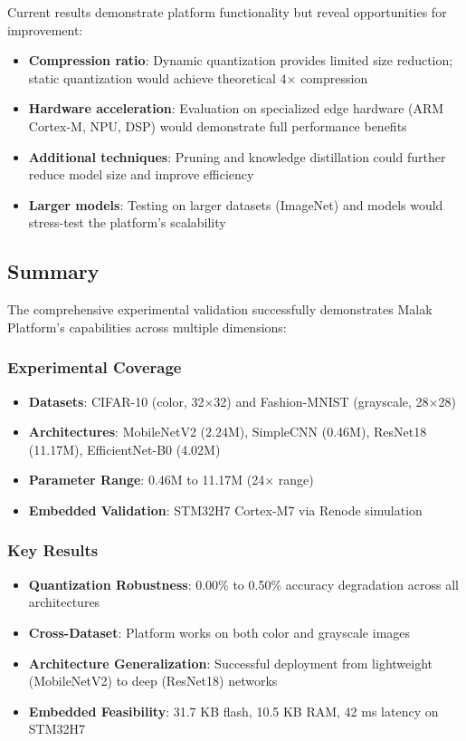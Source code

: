 Current results demonstrate platform functionality but reveal opportunities for improvement:

\begin{itemize}
\item \textbf{Compression ratio}: Dynamic quantization provides limited size reduction; static quantization would achieve theoretical 4$\times$ compression
\item \textbf{Hardware acceleration}: Evaluation on specialized edge hardware (ARM Cortex-M, NPU, DSP) would demonstrate full performance benefits
\item \textbf{Additional techniques}: Pruning and knowledge distillation could further reduce model size and improve efficiency
\item \textbf{Larger models}: Testing on larger datasets (ImageNet) and models would stress-test the platform's scalability
\end{itemize}

\subsection{Summary}

The comprehensive experimental validation successfully demonstrates Malak Platform's capabilities across multiple dimensions:

\subsubsection{Experimental Coverage}
\begin{itemize}
\item \textbf{Datasets}: CIFAR-10 (color, 32$\times$32) and Fashion-MNIST (grayscale, 28$\times$28)
\item \textbf{Architectures}: MobileNetV2 (2.24M), SimpleCNN (0.46M), ResNet18 (11.17M), EfficientNet-B0 (4.02M)
\item \textbf{Parameter Range}: 0.46M to 11.17M (24$\times$ range)
\item \textbf{Embedded Validation}: STM32H7 Cortex-M7 via Renode simulation
\end{itemize}

\subsubsection{Key Results}
\begin{itemize}
\item \textbf{Quantization Robustness}: 0.00\% to 0.50\% accuracy degradation across all architectures
\item \textbf{Cross-Dataset}: Platform works on both color and grayscale images
\item \textbf{Architecture Generalization}: Successful deployment from lightweight (MobileNetV2) to deep (ResNet18) networks
\item \textbf{Embedded Feasibility}: 31.7 KB flash, 10.5 KB RAM, 42 ms latency on STM32H7
\end{itemize}

